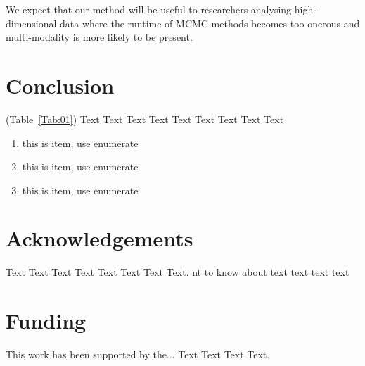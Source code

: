 \documentclass{bioinfo}
\begin{document}
We expect that our method will be useful to researchers analysing high-dimensional data where the runtime of MCMC methods becomes too onerous and multi-modality is more likely to be present.


%
%






\section{Conclusion}

(Table~\ref{Tab:01}) Text Text Text Text Text Text  Text Text Text

\begin{enumerate}
\item this is item, use enumerate
\item this is item, use enumerate
\item this is item, use enumerate
\end{enumerate}




\section*{Acknowledgements}

Text Text Text Text Text Text  Text Text. nt to know about  text
text text text\vspace*{-12pt}

\section*{Funding}

This work has been supported by the... Text Text  Text Text.\vspace*{-12pt}


%
%
%
%
%
%
%
%
  


\end{document}
